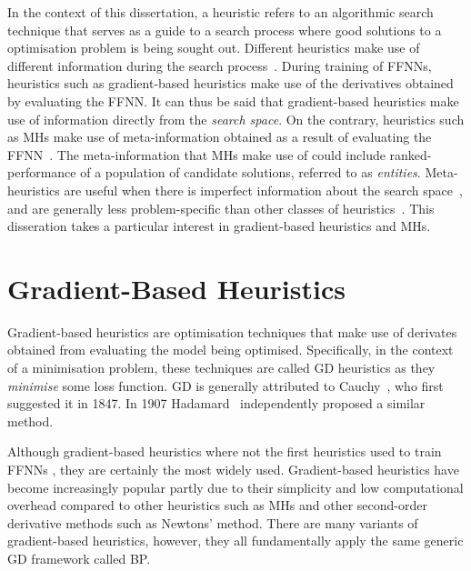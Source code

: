 In the context of this dissertation, a heuristic refers to an algorithmic search technique that serves as a guide to a search process where good solutions to a optimisation problem is being sought out. Different heuristics make use of different information during the search process~\cite{ref:kheiri:2017}. During training of \acp{FFNN}, heuristics such as gradient-based heuristics make use of the derivatives obtained by evaluating the \acs{FFNN}. It can thus be said that gradient-based heuristics make use of information directly from the \textit{search space}. On the contrary, heuristics such as \acp{MH} make use of meta-information obtained as a result of evaluating the \acs{FFNN}~\cite{ref:blum:2003}. The meta-information that \acp{MH} make use of could include ranked-performance of a population of candidate solutions, referred to as \textit{entities}. Meta-heuristics are useful when there is imperfect information about the search space~\cite{ref:bianchi:2009}, and are generally less problem-specific than other classes of heuristics~\cite{ref:blum:2003}. This disseration takes a particular interest in gradient-based heuristics and \acp{MH}.


\section{Gradient-Based Heuristics}\label{sec:heuristics:gd}

Gradient-based heuristics are optimisation techniques that make use of derivates obtained from evaluating the model being optimised. Specifically, in the context of a minimisation problem, these techniques are called \acf{GD} heuristics as they \textit{minimise} some loss function. \Acs{GD} is generally attributed to Cauchy~\cite{ref:lemarechal:2012}, who first suggested it in 1847. In 1907 Hadamard~\cite{ref:hadamard:1908} independently proposed a similar method.

Although gradient-based heuristics where not the first heuristics used to train \acp{FFNN}
\cite{ref:engelbrecht:2007}, they are certainly the most widely used. Gradient-based heuristics have become increasingly popular partly due to their simplicity and low computational overhead compared to other heuristics such as \acp{MH} and other second-order derivative methods such as Newtons' method. There are many variants of gradient-based heuristics, however, they all fundamentally apply the same generic \acf{GD} framework called \acf{BP}.


